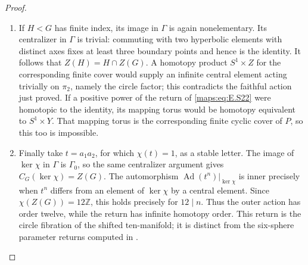 \begin{proof}
\begin{enumerate}[label={$\langle1\rangle$\arabic*.},leftmargin=*]
\item If $H<G$ has finite index, its image in $\Gamma$ is again
nonelementary. Its centralizer in $\Gamma$ is trivial:
commuting with two hyperbolic elements with distinct axes
fixes at least three boundary points and hence is the
identity. It follows that
$Z(H)=H\cap Z(G)$. A homotopy product $S^1\times Z$ for
the corresponding finite cover would supply an infinite
central element acting trivially on $\pi_2$, namely the
circle factor; this contradicts the faithful action just
proved. If a positive power of the return of \eqref{maps:eq:E.S22} were
homotopic to the identity, its mapping torus would be
homotopy equivalent to $S^1\times Y$. That mapping torus
is the corresponding finite cyclic cover of $P$, so this
too is impossible.

\item Finally take $t=a_1a_2$, for which $\chi(t)=1$, as a
stable letter. The image of $\ker\chi$ in $\Gamma$ is
$\Gamma_0$, so the same centralizer argument gives
$C_G(\ker\chi)=Z(G)$. The automorphism
$\operatorname{Ad}(t^n)|_{\ker\chi}$ is inner precisely
when $t^n$ differs from an element of $\ker\chi$ by a
central element. Since $\chi(Z(G))=12\mathbb Z$, this
holds precisely for $12\mid n$. Thus the outer action has
order twelve, while the return has infinite homotopy
order. This return is the circle fibration of the shifted
ten-manifold; it is distinct from the six-sphere parameter
returns computed in .

\end{enumerate}
\end{proof}

